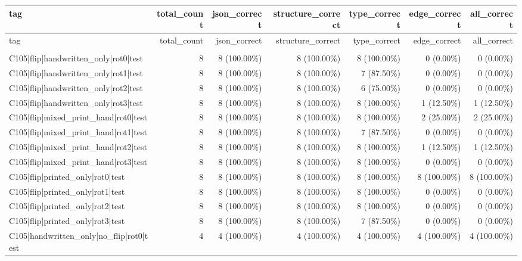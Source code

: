 \begin{longtable}{>{\raggedright\arraybackslash}p{5cm}rrrrrr}
\toprule
tag & total\_count & json\_correct & structure\_correct & type\_correct & edge\_correct & all\_correct \\
\midrule
\endfirsthead
\toprule
tag & total\_count & json\_correct & structure\_correct & type\_correct & edge\_correct & all\_correct \\
\midrule
\endhead
\midrule
\multicolumn{7}{r}{Continued on next page} \\
\midrule
\endfoot
\bottomrule
\endlastfoot
C105|flip|handwritten\_only|rot0|test & 8 & 8 (100.00\%) & 8 (100.00\%) & 8 (100.00\%) & 0 (0.00\%) & 0 (0.00\%) \\
C105|flip|handwritten\_only|rot1|test & 8 & 8 (100.00\%) & 8 (100.00\%) & 7 (87.50\%) & 0 (0.00\%) & 0 (0.00\%) \\
C105|flip|handwritten\_only|rot2|test & 8 & 8 (100.00\%) & 8 (100.00\%) & 6 (75.00\%) & 0 (0.00\%) & 0 (0.00\%) \\
C105|flip|handwritten\_only|rot3|test & 8 & 8 (100.00\%) & 8 (100.00\%) & 8 (100.00\%) & 1 (12.50\%) & 1 (12.50\%) \\
C105|flip|mixed\_print\_hand|rot0|test & 8 & 8 (100.00\%) & 8 (100.00\%) & 8 (100.00\%) & 2 (25.00\%) & 2 (25.00\%) \\
C105|flip|mixed\_print\_hand|rot1|test & 8 & 8 (100.00\%) & 8 (100.00\%) & 7 (87.50\%) & 0 (0.00\%) & 0 (0.00\%) \\
C105|flip|mixed\_print\_hand|rot2|test & 8 & 8 (100.00\%) & 8 (100.00\%) & 8 (100.00\%) & 1 (12.50\%) & 1 (12.50\%) \\
C105|flip|mixed\_print\_hand|rot3|test & 8 & 8 (100.00\%) & 8 (100.00\%) & 8 (100.00\%) & 0 (0.00\%) & 0 (0.00\%) \\
C105|flip|printed\_only|rot0|test & 8 & 8 (100.00\%) & 8 (100.00\%) & 8 (100.00\%) & 8 (100.00\%) & 8 (100.00\%) \\
C105|flip|printed\_only|rot1|test & 8 & 8 (100.00\%) & 8 (100.00\%) & 8 (100.00\%) & 0 (0.00\%) & 0 (0.00\%) \\
C105|flip|printed\_only|rot2|test & 8 & 8 (100.00\%) & 8 (100.00\%) & 8 (100.00\%) & 0 (0.00\%) & 0 (0.00\%) \\
C105|flip|printed\_only|rot3|test & 8 & 8 (100.00\%) & 8 (100.00\%) & 7 (87.50\%) & 0 (0.00\%) & 0 (0.00\%) \\
C105|handwritten\_only|no\_flip|rot0|test & 4 & 4 (100.00\%) & 4 (100.00\%) & 4 (100.00\%) & 4 (100.00\%) & 4 (100.00\%) \\

\end{longtable}
